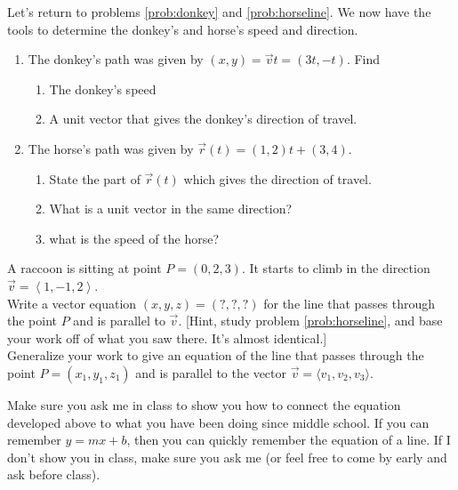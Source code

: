 \begin{problem}
Let's return to problems \ref{prob:donkey} and \ref{prob:horseline}. We now have the tools to determine the donkey's and horse's speed and direction.
\begin{enumerate} 
	\item The donkey's path was given by $(x,y)=\vec v t = (3t,-t)$. Find
	\begin{enumerate}
		\item The donkey's speed
		\item A unit vector that gives the donkey's direction of travel.
	\end{enumerate}
	\item The horse's path was given by $\vec r(t) = (1,2)t + (3,4) $.
	\begin{enumerate}
		\item State the part of $\vec r(t)$ which gives the direction of travel.
		\item What is a unit vector in the same direction?
		\item what is the speed of the horse?
	\end{enumerate}
\end{enumerate}
\end{problem}


\begin{problem}
%
A raccoon is sitting at point $P=(0,2,3)$.  It starts to climb in the direction $\vec v=\left<1,-1,2\right>$.\\
Write a vector equation $(x,y,z)=(?,?,?)$ for the line that passes through the point $P$ and is parallel to $\vec v$. [Hint, study problem \ref{prob:horseline}, and base your work off of what you saw there. It's almost identical.] \\
Generalize your work to give an equation of the line that passes through the point $P=(x_1,y_1,z_1)$ and is parallel to the vector $\vec v=\langle v_1,v_2,v_3 \rangle$. 
\end{problem}

Make sure you ask me in class to show you how to connect the equation developed above to what you have been doing since middle school. If you can remember $y=mx+b$, then you can quickly remember the equation of a line.  If I don't show you in class, make sure you ask me (or feel free to come by early and ask before class).


